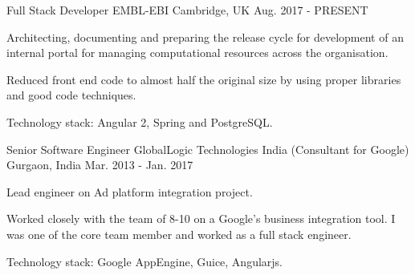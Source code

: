 

\begin{cventries}

  \cventry
    {Full Stack Developer} %
    {EMBL-EBI} %
    {Cambridge, UK} %
    {Aug. 2017 - PRESENT} %
    {
      \begin{cvitems} %
        \item {Architecting, documenting  and preparing the release cycle for development of an internal portal for managing computational resources across the organisation.}
        \item {Reduced front end code to almost half the original size by using proper libraries and good code techniques.}
        \item {Technology stack: Angular 2, Spring and PostgreSQL.}
      \end{cvitems}
    }

  \cventry
    {Senior Software Engineer} %
    {GlobalLogic Technologies India (Consultant for Google)} %
    {Gurgaon, India} %
    {Mar. 2013 - Jan. 2017} %
    {
      \begin{cvitems} %
        \item {Lead engineer on Ad platform integration project.}
        \item {Worked closely with the team of 8-10 on a Google’s business integration tool. I was one of the core team member and worked as a full stack engineer.}
        \item {Technology stack: Google AppEngine, Guice, Angularjs.}
      \end{cvitems}
    }


\end{cventries}
